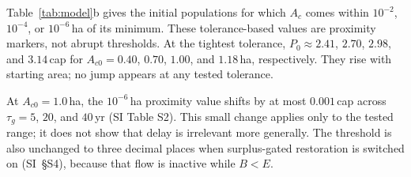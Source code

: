 \documentclass[preprint,12pt,authoryear]{elsarticle}
\begin{document}
Table~\ref{tab:model}b gives the initial populations for which $A_c$ comes within $10^{-2}$, $10^{-4}$, or $10^{-6}$\,ha of its minimum. These tolerance-based values are proximity markers, not abrupt thresholds. At the tightest tolerance, $P_0\approx2.41$, $2.70$, $2.98$, and $3.14$\,cap for $A_{c0}=0.40$, $0.70$, $1.00$, and $1.18$\,ha, respectively. They rise with starting area; no jump appears at any tested tolerance.

At $A_{c0}=1.0$\,ha, the $10^{-6}$\,ha proximity value shifts by at most $0.001$\,cap across $\tau_g=5$, $20$, and $40$\,yr (SI Table S2). This small change applies only to the tested range; it does not show that delay is irrelevant more generally. The threshold is also unchanged to three decimal places when surplus-gated restoration is switched on (SI~\S S4), because that flow is inactive while $B<E$.
\end{document}
